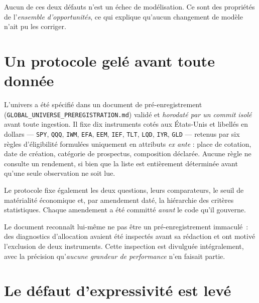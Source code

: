 \begin{remarquebox}
Aucun de ces deux défauts n'est un échec de modélisation. Ce sont des propriétés
de l'\emph{ensemble d'opportunités}, ce qui explique qu'aucun changement de
modèle n'ait pu les corriger.
\end{remarquebox}

\section{Un protocole gelé avant toute donnée}

L'univers a été spécifié dans un document de pré-enregistrement
(\texttt{GLOBAL\_UNIVERSE\_PREREGISTRATION.md}) validé et \emph{horodaté par un
commit isolé} avant toute ingestion. Il fixe dix instruments cotés aux
États-Unis et libellés en dollars — \texttt{SPY}, \texttt{QQQ}, \texttt{IWM},
\texttt{EFA}, \texttt{EEM}, \texttt{IEF}, \texttt{TLT}, \texttt{LQD},
\texttt{IYR}, \texttt{GLD} — retenus par six règles d'éligibilité formulées
uniquement en attributs \emph{ex ante} : place de cotation, date de création,
catégorie de prospectus, composition déclarée. Aucune règle ne consulte un
rendement, si bien que la liste est entièrement déterminée avant qu'une seule
observation ne soit lue.

Le protocole fixe également les deux questions, leurs comparateurs, le seuil de
matérialité économique et, par amendement daté, la hiérarchie des critères
statistiques. Chaque amendement a été committé \emph{avant} le code qu'il
gouverne.

\begin{remarquebox}
Le document reconnaît lui-même ne pas être un pré-enregistrement immaculé~: des
diagnostics d'allocation avaient été inspectés avant sa rédaction et ont motivé
l'exclusion de deux instruments. Cette inspection est divulguée intégralement,
avec la précision qu'\emph{aucune grandeur de performance} n'en faisait partie.
\end{remarquebox}

\section{Le défaut d'expressivité est levé}

